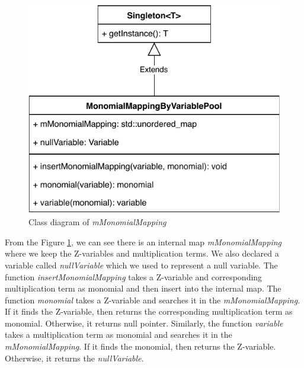 \begin{figure}[ht!]
  \centering
  \includegraphics[width=0.6\linewidth]{./figures/MonomialMappingByVariablePool.pdf}
  \caption{Class diagram of \textit{mMonomialMapping}}
  \label{fig:class_diagram_of_mMonomialMapping}
\end{figure}

\noindent From the Figure \ref{fig:class_diagram_of_mMonomialMapping}, we can see there is an internal map \textit{mMonomialMapping} where we keep the Z-variables and multiplication terms.
We also declared a variable called \textit{nullVariable} which we used to represent a null variable.
The function \textit{insertMonomialMapping} takes a Z-variable and corresponding multiplication term as monomial and then insert into the internal map.
The function \textit{monomial} takes a Z-variable and searches it in the \textit{mMonomialMapping}.
If it finds the Z-variable, then returns the corresponding multiplication term as monomial.
Otherwise, it returns null pointer.
Similarly, the function \textit{variable} takes a multiplication term as monomial and searches it in the \textit{mMonomialMapping}.
If it finds the monomial, then returns the Z-variable.
Otherwise, it returns the \textit{nullVariable}.

